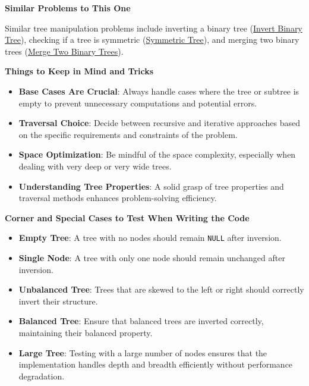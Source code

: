 \textbf{Similar Problems to This One}

Similar tree manipulation problems include inverting a binary tree (\hyperref[problem:invert_binary_tree]{Invert Binary Tree}), checking if a tree is symmetric (\hyperref[problem:symmetric_tree]{Symmetric Tree}), and merging two binary trees (\hyperref[problem:merge_two_binary_trees]{Merge Two Binary Trees}).

\textbf{Things to Keep in Mind and Tricks}

\begin{itemize}
    \item \textbf{Base Cases Are Crucial}: Always handle cases where the tree or subtree is empty to prevent unnecessary computations and potential errors.
    \item \textbf{Traversal Choice}: Decide between recursive and iterative approaches based on the specific requirements and constraints of the problem.
    \item \textbf{Space Optimization}: Be mindful of the space complexity, especially when dealing with very deep or very wide trees.
    \item \textbf{Understanding Tree Properties}: A solid grasp of tree properties and traversal methods enhances problem-solving efficiency.
\end{itemize}

\textbf{Corner and Special Cases to Test When Writing the Code}

\begin{itemize}
    \item \textbf{Empty Tree}: A tree with no nodes should remain \texttt{NULL} after inversion.
    \item \textbf{Single Node}: A tree with only one node should remain unchanged after inversion.
    \item \textbf{Unbalanced Tree}: Trees that are skewed to the left or right should correctly invert their structure.
    \item \textbf{Balanced Tree}: Ensure that balanced trees are inverted correctly, maintaining their balanced property.
    \item \textbf{Large Tree}: Testing with a large number of nodes ensures that the implementation handles depth and breadth efficiently without performance degradation.
\end{itemize}